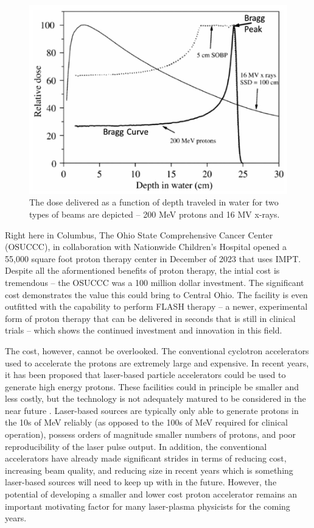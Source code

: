\begin{figure}
	\centering
	\includegraphics[width=0.75\linewidth]{planning/images/bragg_curve.PNG}
	\caption{The dose delivered as a function of depth traveled in water for two types of beams are depicted -- 200 MeV protons and 16 MV x-rays.}
	\label{fig:bragg_curve}
\end{figure}
 
Right here in Columbus, The Ohio State Comprehensive Cancer Center (OSUCCC), in collaboration with Nationwide Children's Hospital opened a 55,000 square foot proton therapy center in December of 2023 \cite{OSU_CCC} that uses IMPT. Despite all the aformentioned benefits of proton therapy, the intial cost is tremendous -- the OSUCCC was a 100 million dollar investment. The significant cost demonstrates the value this could bring to Central Ohio. The facility is even outfitted with the capability to perform FLASH therapy -- a newer, experimental form of proton therapy that can be delivered in seconds that is still in clinical trials \cite{OSU_CCC} -- which shows the continued investment and innovation in this field. 

The cost, however, cannot be overlooked. The conventional cyclotron accelerators used to accelerate the protons are extremely large and expensive. In recent years, it has been proposed that laser-based particle accelerators could be used to generate high energy protons. These facilities could in principle be smaller and less costly, but the technology is not adequately matured to be considered in the near future \cite{Linz_2016_LaPB}. Laser-based sources are typically only able to generate protons in the 10s of MeV reliably (as opposed to the 100s of MeV required for clinical operation), possess orders of magnitude smaller numbers of protons, and poor reproducibility of the laser pulse output. In addition, the conventional accelerators have already made significant strides in terms of reducing cost, increasing beam quality, and reducing size in recent years \cite{Linz_2016_LaPB} which is something laser-based sources will need to keep up with in the future. However, the potential of developing a smaller and lower cost proton accelerator remains an important motivating factor for many laser-plasma physicists for the coming years.

